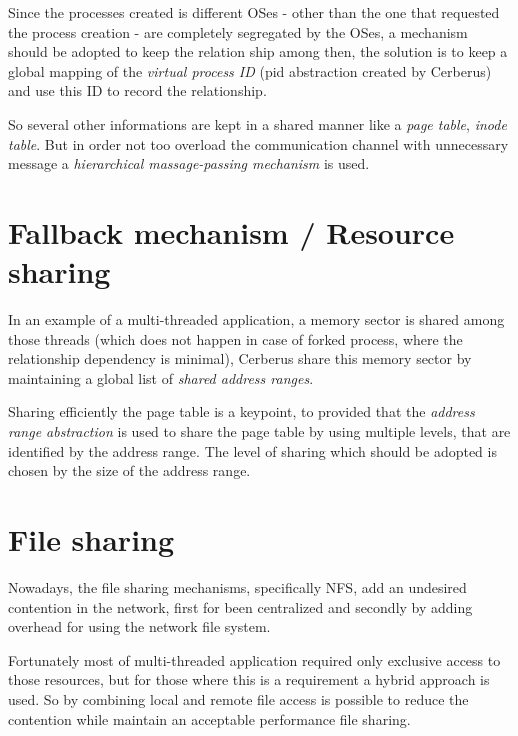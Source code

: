 \documentclass[journal]{IEEEtran}
\begin{document}
\begin{itemize}
	Since the processes created is different OSes - other than the one that requested the process creation - are completely segregated by the OSes, a mechanism should be adopted to keep the relation ship among then, the solution is to keep a global mapping of the \emph{virtual process ID} (pid abstraction created by Cerberus) and use this ID to record the relationship.
	
	So several other informations are kept in a shared manner like a \emph{page table}, \emph{inode table}. But in order not too overload the communication channel with unnecessary message a \emph{hierarchical massage-passing mechanism} is used.
	
	\section{Fallback mechanism / Resource sharing}
	
	In an example of a multi-threaded application, a memory sector is shared among those threads (which does not happen in case of forked process, where the relationship dependency is minimal), Cerberus share this memory sector by maintaining a global list of \emph{shared address ranges}.
	
	
	Sharing efficiently the page table is a keypoint, to provided that the \emph{address range abstraction} is used to share the page table by using multiple levels, that are identified by the address range. The level of sharing which should be adopted is chosen by the size of the address range.
	
	
	\section{File sharing}
	
	Nowadays, the file sharing mechanisms, specifically NFS, add an undesired contention in the network, first for been centralized and secondly by adding overhead for using the network file system. %
	
	Fortunately most of multi-threaded application required only exclusive access to those resources, but for those where this is a requirement a hybrid approach is used. So by combining local and remote file access is possible to reduce the contention while maintain an acceptable performance file sharing. %
	

\end{itemize}
\end{document}
